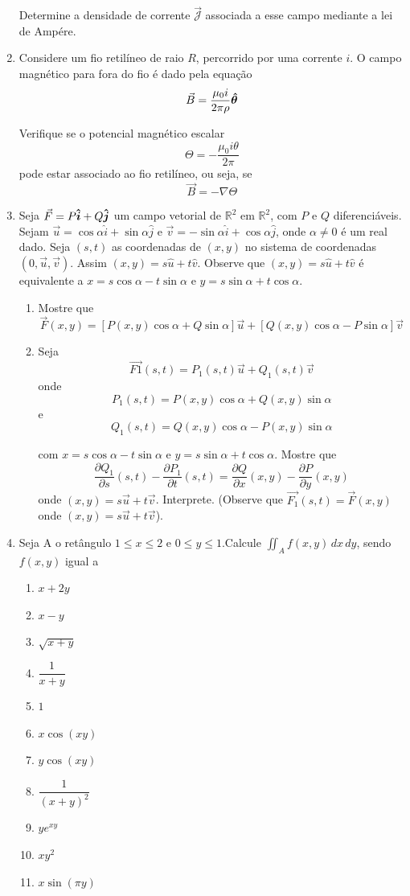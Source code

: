 \documentclass[11pt,a4paper]{article}
\newcommand{\mat}[1]{\mbox{\boldmath{$#1$}}}
\begin{document}
\begin{enumerate}
	Determine a densidade de corrente $\mathcal{\vec{J}}$ associada a esse campo mediante a lei de Ampére.
	
	\item Considere um fio retilíneo de raio $R$, percorrido por uma corrente $i$. O campo magnético para fora do fio é dado pela equação
	$$\vec{B} = \displaystyle\dfrac{\mu_0 i}{2\pi \rho} \mat{\hat{\theta}}$$ 
	
	Verifique se o potencial magnético escalar 
	$$\Theta = - \displaystyle\dfrac{\mu_0 i \theta}{2\pi}$$
	pode estar associado ao fio retilíneo, ou seja, se 
	$$\vec{B} = - \nabla \Theta$$
	
	\item Seja $\vec{F} = P \mat{\hat{i}} + Q \mat{\hat{j}}$ um campo vetorial de $\mathbb{R}^2$ em $\mathbb{R}^2$, com $P$ e $Q$ diferenciáveis. Sejam $\vec{u} = \cos \alpha \hat{i} + \sin \alpha \hat{j}$ e $\vec{v} = - \sin \alpha \hat{i} + \cos \alpha \hat{j}$, onde $\alpha \neq 0$ é um real dado. Seja $(s,t)$ as coordenadas de $(x,y)$ no sistema de coordenadas $(0, \vec{u}, \vec{v})$. Assim $(x,y) = s \hat{u} + t \hat{v}$. Observe que $(x,y) = s \hat{u} + t \hat{v}$ é equivalente a $x = s \cos \alpha - t \sin \alpha$ e $y = s \sin \alpha + t \cos \alpha$.
	\begin{enumerate}
		\item Mostre que
		$$\vec{F}(x,y) = [P(x,y) \cos \alpha + Q \sin \alpha] \vec{u} + [Q(x,y) \cos \alpha - P \sin \alpha] \vec{v}$$
		\item Seja
		$$\vec{F1}(s,t) = P_1(s,t) \vec{u} + Q_1(s,t)\vec{v}$$
		onde
		$$P_1(s,t) = P(x,y)\cos \alpha + Q(x,y) \sin \alpha$$
		e
		$$Q_1(s,t) = Q(x,y)\cos \alpha - P(x,y) \sin \alpha$$
		
		com $x = s\cos \alpha - t \sin \alpha$ e $y = s\sin \alpha + t \cos \alpha$. Mostre que
		$$\dfrac{\partial Q_1 }{\partial s}(s,t) - \dfrac{\partial P_1 }{\partial t}(s,t) = \dfrac{\partial Q}{\partial x}(x,y) - \dfrac{\partial P}{\partial y}(x,y)$$
		onde $(x,y) = s \vec{u} + t\vec{v}$. Interprete. (Observe que $\vec{F_1}(s,t) = \vec{F}(x,y)$ onde $(x,y) = s \vec{u} + t\vec{v}$).
		
	\end{enumerate}
	
	\item Seja A o retângulo $1 \leq x \leq 2$ e $0 \leq y \leq 1$.Calcule $\displaystyle\iint_A f(x,y) \,dx\,dy$, sendo $f(x,y)$ igual a
	\begin{enumerate}
	\item $x + 2y$
	\item $x - y$
	\item $\sqrt{x + y}$
	\item $\displaystyle\dfrac{1}{x+y}$
	\item $1$
	\item $x\cos (xy)$
	\item $y\cos (xy)$
	\item $\displaystyle\dfrac{1}{(x+y)^2}$
	\item $ye^{xy}$
	\item $xy^2$
	\item $x\sin (\pi y)$
	

\end{enumerate}
\end{enumerate}
\end{document}
